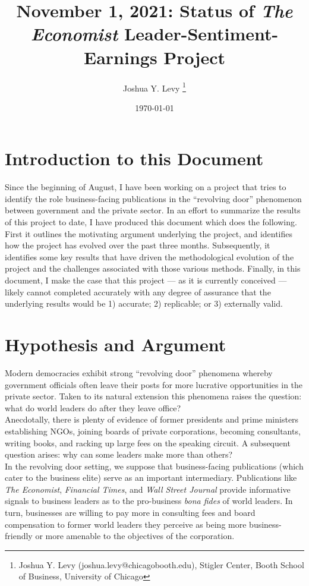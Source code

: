 \documentclass[11pt, letterpaper, twoside]{article}
\title{\singlespacing\textbf{November 1, 2021: Status of \textit{The Economist} Leader-Sentiment-Earnings Project}}
\author{Joshua Y. Levy \thanks{Joshua Y. Levy  (joshua.levy@chicagobooth.edu), Stigler Center, Booth School of Business, University of Chicago}}
\date{\today}
\begin{document}
\begin{titlepage}
    \maketitle
    \thispagestyle{empty}
\end{titlepage}


\newpage
{}

\section{Introduction to this Document}
Since the beginning of August, I have been working on a project that tries to identify the role business-facing publications in the ``revolving door'' phenomenon between government and the private sector. In an effort to summarize the results of this project to date, I have produced this document which does the following. First it outlines the motivating argument underlying the project, and identifies how the project has evolved over the past three months. Subsequently, it identifies some key results that have driven the methodological evolution of the project and the challenges associated with those various methods. Finally, in this document, I make the case that this project  --- as it is currently conceived --- likely cannot completed accurately with any degree of assurance that the underlying results would be 1) accurate; 2) replicable; or 3) externally valid.

\section{Hypothesis and Argument}
Modern democracies exhibit strong ``revolving door'' phenomena whereby government officials often leave their posts for more lucrative opportunities in the private sector. Taken to its natural extension this phenomena raises the question: what do world leaders do after they leave office?\\

Anecdotally, there is plenty of evidence of former presidents and prime ministers establishing NGOs, joining boards of private corporations, becoming consultants, writing books, and racking up large fees on the speaking circuit. A subsequent question arises: why can some leaders make more than others?\\

In the revolving door setting, we suppose that business-facing publications (which cater to the business elite) serve as an important intermediary. Publications like \textit{The Economist}, \textit{Financial Times}, and \textit{Wall Street Journal} provide informative signals to business leaders as to the pro-business \textit{bona fides} of world leaders. In turn, businesses are willing to pay more in consulting fees and board compensation to former world leaders they perceive as being more business-friendly or more amenable to the objectives of the corporation.\\
\end{document}
